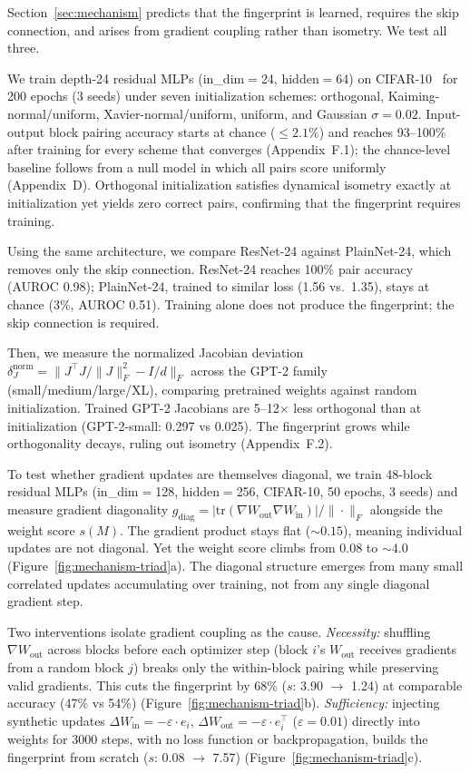 \documentclass[letterpaper]{article}
\begin{document}
Section~\ref{sec:mechanism} predicts that the fingerprint is learned, requires the skip connection, and arises from gradient coupling rather than isometry. We test all three.

We train depth-24 residual MLPs (in\_dim$=$24, hidden$=$64) on CIFAR-10~\citep{krizhevsky2009cifar} for 200 epochs (3 seeds) under seven initialization schemes: orthogonal, Kaiming-normal/uniform, Xavier-normal/uniform, uniform, and Gaussian $\sigma{=}0.02$. Input-output block pairing accuracy starts at chance (${\leq}2.1\%$) and reaches 93--100\% after training for every scheme that converges (Appendix~F.1); the chance-level baseline follows from a null model in which all pairs score uniformly (Appendix~D). Orthogonal initialization satisfies dynamical isometry exactly at initialization yet yields zero correct pairs, confirming that the fingerprint requires training.

Using the same architecture, we compare ResNet-24 against PlainNet-24, which removes only the skip connection. ResNet-24 reaches 100\% pair accuracy (AUROC 0.98); PlainNet-24, trained to similar loss (1.56 vs.\ 1.35), stays at chance (3\%, AUROC 0.51). Training alone does not produce the fingerprint; the skip connection is required.

Then, we measure the normalized Jacobian deviation $\delta_J^{\mathrm{norm}} = \|J^\top J/\|J\|_F^2 - I/d\|_F$ across the GPT-2 family (small/medium/large/XL), comparing pretrained weights against random initialization. Trained GPT-2 Jacobians are 5--12$\times$ less orthogonal than at initialization (GPT-2-small: 0.297 vs 0.025). The fingerprint grows while orthogonality decays, ruling out isometry (Appendix~F.2).

To test whether gradient updates are themselves diagonal, we train 48-block residual MLPs (in\_dim$=$128, hidden$=$256, CIFAR-10, 50 epochs, 3 seeds) and measure gradient diagonality $g_{\mathrm{diag}} = |\mathrm{tr}(\nabla W_{\mathrm{out}} \nabla W_{\mathrm{in}})|/\|\cdot\|_F$ alongside the weight score $s(M)$. The gradient product stays flat (${\sim}0.15$), meaning individual updates are not diagonal. Yet the weight score climbs from 0.08 to ${\sim}4.0$ (Figure~\ref{fig:mechanism-triad}a). The diagonal structure emerges from many small correlated updates accumulating over training, not from any single diagonal gradient step.

Two interventions isolate gradient coupling as the cause. \emph{Necessity:} shuffling $\nabla W_{\mathrm{out}}$ across blocks before each optimizer step (block $i$'s $W_{\mathrm{out}}$ receives gradients from a random block $j$) breaks only the within-block pairing while preserving valid gradients. This cuts the fingerprint by 68\% ($s$: 3.90 $\to$ 1.24) at comparable accuracy (47\% vs 54\%) (Figure~\ref{fig:mechanism-triad}b). \emph{Sufficiency:} injecting synthetic updates $\Delta W_{\mathrm{in}} = -\varepsilon \cdot e_i$, $\Delta W_{\mathrm{out}} = -\varepsilon \cdot e_i^\top$ ($\varepsilon{=}0.01$) directly into weights for 3000 steps, with no loss function or backpropagation, builds the fingerprint from scratch ($s$: 0.08 $\to$ 7.57) (Figure~\ref{fig:mechanism-triad}c).
\end{document}
